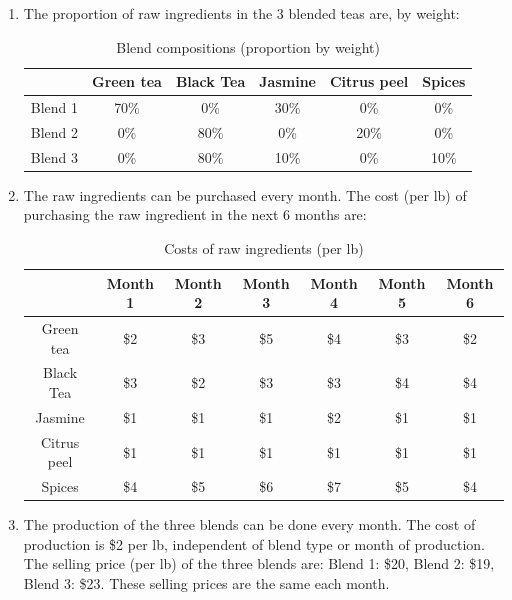 \documentclass[11pt]{article}
\begin{document}
\begin{enumerate}
\begin{enumerate}
\item The proportion of raw ingredients in the 3 blended teas are, by weight:
\begin{table}[htp]
\caption{Blend compositions (proportion by weight)}
\begin{center}
\begin{tabular}{|c|c|c|c|c|c|}
\hline
& Green tea & Black Tea & Jasmine & Citrus peel & Spices \\
\hline 
Blend 1 & 70\% & 0\% & 30\% & 0\%& 0\%\\ 
\hline 
Blend 2 &0\%  & 80\%& 0\%& 20\% &0\% \\ 
\hline
Blend 3 &  0\%& 80\%& 10\% &0\% & 10\% \\ 
\hline
\end{tabular}
\end{center}
\label{BlendCompositions}
\end{table}%

\item The raw ingredients can be purchased every month. The cost (per lb) of purchasing the raw ingredient in the next 6 months are:
\begin{table}[htp]
\caption{Costs of raw ingredients (per lb)}
\begin{center}
\begin{tabular}{|c|c|c|c|c|c|c|}
\hline
 & Month 1 & Month 2 & Month 3 & Month 4 & Month 5 & Month 6 \\
\hline
Green tea & \$2 &\$3  &\$5  &\$4  &\$3 & \$2\\
\hline 
Black Tea  & \$3  & \$2 & \$3 & \$3& \$4 & \$4\\ 
\hline 
Jasmine & \$1 &\$1 &\$1 &\$2 & \$1& \$1\\ 
\hline
Citrus peel & \$1 &\$1 & \$1& \$1& \$1&\$1 \\ 
\hline
Spices & \$4 & \$5 & \$6 & \$7 &\$5 & \$4 \\
\hline 
\end{tabular}
\end{center}
\label{Costs}
\end{table}%

\item The production of the three blends can be done every month. The cost of production is \$2 per  lb, independent of blend type or month of production. The selling price (per lb) of the three blends are: Blend 1: \$20, Blend 2: \$19, Blend 3: \$23. These selling prices are the same each month. 
 

\end{enumerate}
\end{enumerate}
\end{document}
